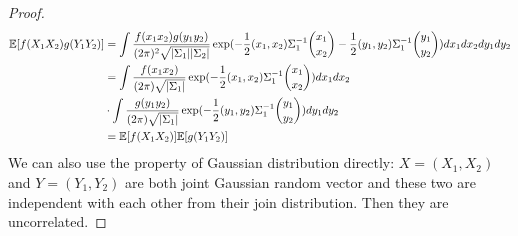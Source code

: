 \documentclass{article}
\DeclarePairedDelimiter\abs{\lvert}{\rvert}
\def\E{\mathbb{E}}
\begin{document}
\begin{proof}
\begin{align*}
\E[f(X_1X_2)g(Y_1Y_2)] & = \int \frac{f(x_1 x_2) g(y_1 y_2) }{(2\pi)^2 \sqrt{\abs{\Sigma_1}\abs{\Sigma_2}}}\exp(-\frac{1}{2}(x_1, x_2) \Sigma_1^{-1} \binom{x_1}{x_2}-\frac{1}{2}(y_1, y_2) \Sigma_1^{-1} \binom{y_1}{y_2})dx_1 d x_2 dy_1 dy_2 \\
& = \int \frac{f(x_1 x_2)  }{(2\pi) \sqrt{\abs{\Sigma_1}}}\exp(-\frac{1}{2}(x_1, x_2) \Sigma_1^{-1} \binom{x_1}{x_2})dx_1 d x_2  \\
&\cdot  \int \frac{ g(y_1 y_2)  }{(2\pi) \sqrt{\abs{\Sigma_1}}}\exp(-\frac{1}{2}(y_1, y_2) \Sigma_1^{-1} \binom{y_1}{y_2})dy_1 d y_2 \\
& = \E[f(X_1 X_2)] \E[g(Y_1 Y_2)]
\end{align*}
We can also use the property of Gaussian distribution directly: $X=(X_1, X_2)$ and $Y=(Y_1, Y_2)$ are both joint Gaussian random vector and these two are independent with each other from their join distribution. Then they are uncorrelated.
\end{proof}
\end{document}
